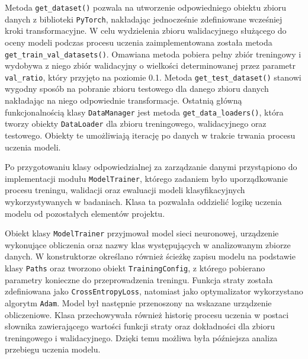 Metoda \texttt{get\_dataset()} pozwala na utworzenie odpowiedniego obiektu zbioru danych z biblioteki \texttt{PyTorch}, nakładając jednocześnie zdefiniowane wcześniej kroki transformacyjne. W celu wydzielenia zbioru walidacyjnego służącego do oceny modeli podczas procesu uczenia zaimplementowana została metoda \texttt{get\_train\_val\_datasets()}. Omawiana metoda pobiera pełny zbiór treningowy i wydobywa z niego zbiór walidacyjny o wielkości determinowanej przez parametr \texttt{val\_ratio}, który przyjęto na poziomie 0.1. Metoda \texttt{get\_test\_dataset()} stanowi wygodny sposób na pobranie zbioru testowego dla danego zbioru danych nakładając na niego odpowiednie transformacje. Ostatnią główną funkcjonalnością klasy \texttt{DataManager} jest metoda \texttt{get\_data\_loaders()}, która tworzy obiekty \texttt{DataLoader} dla zbioru treningowego, walidacyjnego oraz testowego. Obiekty te umożliwiają iterację po danych w trakcie trwania procesu uczenia modeli.

Po przygotowaniu klasy odpowiedzialnej za zarządzanie danymi przystąpiono do implementacji modułu \texttt{ModelTrainer}, którego zadaniem było uporządkowanie procesu treningu, walidacji oraz ewaluacji modeli klasyfikacyjnych wykorzystywanych w badaniach. Klasa ta pozwalała oddzielić logikę uczenia modelu od pozostałych elementów projektu.

Obiekt klasy \texttt{ModelTrainer} przyjmował model sieci neuronowej, urządzenie wykonujące obliczenia oraz nazwy klas występujących w analizowanym zbiorze danych. W konstruktorze określano również ścieżkę zapisu modelu na podstawie klasy \texttt{Paths} oraz tworzono obiekt \texttt{TrainingConfig}, z którego pobierano parametry konieczne do przeprowadzenia treningu. Funkcja straty została zdefiniowana jako \texttt{CrossEntropyLoss}, natomiast jako optymalizator wykorzystano algorytm \texttt{Adam}. Model był następnie przenoszony na wskazane urządzenie obliczeniowe. Klasa przechowywała również historię procesu uczenia w postaci słownika zawierającego wartości funkcji straty oraz dokładności dla zbioru treningowego i walidacyjnego. Dzięki temu możliwa była późniejsza analiza przebiegu uczenia modelu. 

